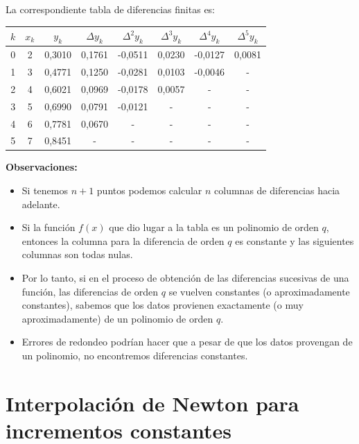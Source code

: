\documentclass[openany]{book}
\providecommand{\tightlist}{%
  \setlength{\itemsep}{0pt}\setlength{\parskip}{0pt}}
\begin{document}
La correspondiente tabla de diferencias finitas es:

\begin{longtable}[]{@{}cccccccc@{}}
\toprule
\(k\) & \(x_k\) & \(y_k\) & \(\Delta y_k\) & \(\Delta^2 y_k\) & \(\Delta^3 y_k\) & \(\Delta^4 y_k\) & \(\Delta^5 y_k\)\tabularnewline
\midrule
\endhead
0 & 2 & 0,3010 & 0,1761 & -0,0511 & 0,0230 & -0,0127 & 0,0081\tabularnewline
1 & 3 & 0,4771 & 0,1250 & -0,0281 & 0,0103 & -0,0046 & -\tabularnewline
2 & 4 & 0,6021 & 0,0969 & -0,0178 & 0,0057 & - & -\tabularnewline
3 & 5 & 0,6990 & 0,0791 & -0,0121 & - & - & -\tabularnewline
4 & 6 & 0,7781 & 0,0670 & - & - & - & -\tabularnewline
5 & 7 & 0,8451 & - & - & - & - & -\tabularnewline
\bottomrule
\end{longtable}

\textbf{Observaciones:}

\begin{itemize}
\tightlist
\item
  Si tenemos \(n+1\) puntos podemos calcular \(n\) columnas de diferencias hacia adelante.
\item
  Si la función \(f(x)\) que dio lugar a la tabla es un polinomio de orden \(q\), entonces la columna para la diferencia de orden \(q\) es constante y las siguientes columnas son todas nulas.
\item
  Por lo tanto, si en el proceso de obtención de las diferencias sucesivas de una función, las diferencias de orden \(q\) se vuelven constantes (o aproximadamente constantes), sabemos que los datos provienen exactamente (o muy aproximadamente) de un polinomio de orden \(q\).
\item
  Errores de redondeo podrían hacer que a pesar de que los datos provengan de un polinomio, no encontremos diferencias constantes.
\end{itemize}

\hypertarget{interpolaciuxf3n-de-newton-para-incrementos-constantes}{%
\section{Interpolación de Newton para incrementos constantes}\label{interpolaciuxf3n-de-newton-para-incrementos-constantes}}
\end{document}

